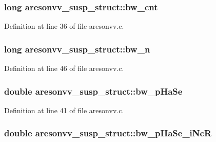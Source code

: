 \subsubsection[{\texorpdfstring{bw\+\_\+cnt}{bw_cnt}}]{\setlength{\rightskip}{0pt plus 5cm}long aresonvv\+\_\+susp\+\_\+struct\+::bw\+\_\+cnt}\hypertarget{structaresonvv__susp__struct_a719adcd72f244baac0b48586ca8cc4f2}{}\label{structaresonvv__susp__struct_a719adcd72f244baac0b48586ca8cc4f2}


Definition at line 36 of file aresonvv.\+c.

\subsubsection[{\texorpdfstring{bw\+\_\+n}{bw_n}}]{\setlength{\rightskip}{0pt plus 5cm}long aresonvv\+\_\+susp\+\_\+struct\+::bw\+\_\+n}\hypertarget{structaresonvv__susp__struct_a1b1fcb0927ce18cb5ed6d5068d010ea3}{}\label{structaresonvv__susp__struct_a1b1fcb0927ce18cb5ed6d5068d010ea3}


Definition at line 46 of file aresonvv.\+c.

\subsubsection[{\texorpdfstring{bw\+\_\+p\+Ha\+Se}{bw_pHaSe}}]{\setlength{\rightskip}{0pt plus 5cm}double aresonvv\+\_\+susp\+\_\+struct\+::bw\+\_\+p\+Ha\+Se}\hypertarget{structaresonvv__susp__struct_add509c299a6723b3843185d45b350620}{}\label{structaresonvv__susp__struct_add509c299a6723b3843185d45b350620}


Definition at line 41 of file aresonvv.\+c.

\subsubsection[{\texorpdfstring{bw\+\_\+p\+Ha\+Se\+\_\+i\+NcR}{bw_pHaSe_iNcR}}]{\setlength{\rightskip}{0pt plus 5cm}double aresonvv\+\_\+susp\+\_\+struct\+::bw\+\_\+p\+Ha\+Se\+\_\+i\+NcR}\hypertarget{structaresonvv__susp__struct_a2d630cb7d2269b4f8887fde0e53bce62}{}\label{structaresonvv__susp__struct_a2d630cb7d2269b4f8887fde0e53bce62}


